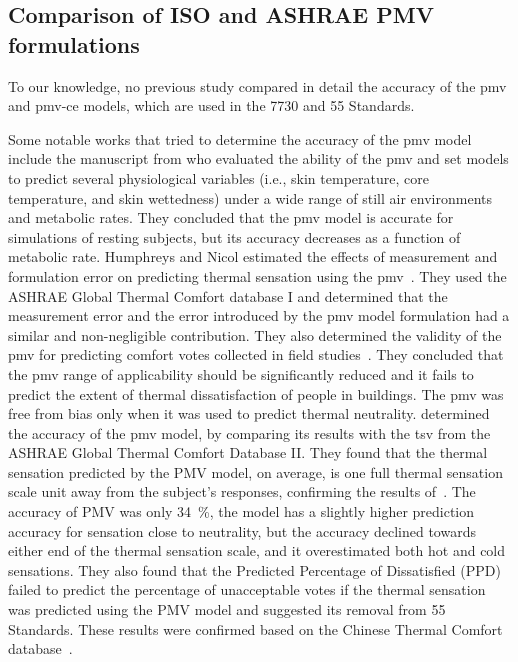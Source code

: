 \subsection{Comparison of ISO and ASHRAE PMV formulations}\label{subsec:comparision-of-pmv-formulations}
To our knowledge, no previous study compared in detail the accuracy of the \ac{pmv} and \ac{pmv-ce} models, which are used in the \gls{7730} and \gls{55} Standards.

Some notable works that tried to determine the accuracy of the \ac{pmv} model include the manuscript from  who evaluated the ability of the \ac{pmv} and \ac{set} models to predict several physiological variables (i.e., skin temperature, core temperature, and skin wettedness) under a wide range of still air environments and metabolic rates.
They concluded that the \ac{pmv} model is accurate for simulations of resting subjects, but its accuracy decreases as a function of metabolic rate.
Humphreys and Nicol estimated the effects of measurement and formulation error on predicting thermal sensation using the \ac{pmv}~\cite{Humphreys2000}.
They used the ASHRAE Global Thermal Comfort database I and determined that the measurement error and the error introduced by the \ac{pmv} model formulation had a similar and non-negligible contribution.
They also determined the validity of the \ac{pmv} for predicting comfort votes collected in field studies~\cite{Humphreys2002}.
They concluded that the \ac{pmv} range of applicability should be significantly reduced and it fails to predict the extent of thermal dissatisfaction of people in buildings.
The \ac{pmv} was free from bias only when it was used to predict thermal neutrality.
 determined the accuracy of the \ac{pmv} model, by comparing its results with the \ac{tsv} from the ASHRAE Global Thermal Comfort Database II.
They found that the thermal sensation predicted by the PMV model, on average, is one full thermal sensation scale unit away from the subject’s responses, confirming the results of~\cite{Humphreys2002}.
The accuracy of PMV was only \qty{34}{\percent}, the model has a slightly higher prediction accuracy for sensation close to neutrality, but the accuracy declined towards either end of the thermal sensation scale, and it overestimated both hot and cold sensations.
They also found that the Predicted Percentage of Dissatisfied (PPD) failed to predict the percentage of unacceptable votes if the thermal sensation was predicted using the PMV model and suggested its removal from \gls{55} Standards.
These results were confirmed based on the Chinese Thermal Comfort database~\cite{du_evaluation_2022}.
